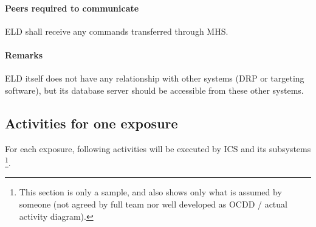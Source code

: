 \documentclass[a4paper,notitlepage]{article}
\begin{document}
\paragraph{Peers required to communicate}
ELD shall receive any commands transferred through MHS. 
\paragraph{Remarks}
ELD itself does not have any relationship with other systems (DRP or targeting 
software), but its database server should be accessible from these other 
systems.


\subsection{Activities for one exposure}

For each exposure, following activities will be executed by ICS and its 
subsystems
\footnote{This section is only a sample, and also shows only what is assumed 
by someone (not agreed by full team nor well developed as OCDD / actual 
activity diagram).}.
\end{document}
